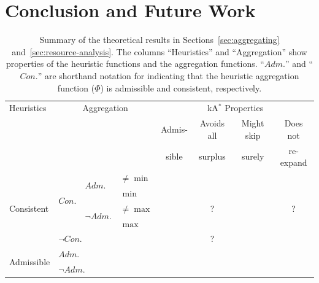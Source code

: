 \documentclass[smallextended]{svjour3}       %
\newcommand{\cmark}{\textcolor{green}{\ding{51}}}
\newcommand{\xmark}{\textcolor{red}{\ding{55}}}
\newcommand{\kastar}{kA$^*$\xspace}
\newcommand{\axiomadm}{admissible\xspace}
\newcommand{\axiomcons}{consistent\xspace}
\newcommand{\axiomreexp}{re-expansion-avoiding\xspace}
\newcommand{\shortadm}{\mathit{Adm.}}
\newcommand{\shortcon}{\mathit{Con.}}
\newcommand{\shortree}{\mathit{Ree.}}
\begin{document}

\section{Conclusion and Future Work}
\label{sec:conclusion}


\begin{table}
\centering
\begin{tabular}{ll@{\;}l@{\;}l*4{c}}
\toprule
Heuristics & \multicolumn{3}{c}{Aggregation} & \multicolumn{4}{c}{\kastar Properties}\\
\cmidrule{5-8}
&&&& \multirow{1}{*}{Admis-} & Avoids all & Might skip & Does not \\
&&&& sible & surplus & surely & re-expand\\
\midrule
\multirow{5}{*}{Consistent}
& \multirow{4}{*}{$\shortcon$} & \multirow{2}{*}{$\shortadm$} & $\neq \min$ & \cmark & \xmark & \xmark & \xmark \\
& & & $\min$ &  \cmark & \cmark & \xmark & \cmark\\
\cmidrule{3-4}
& & \multirow{2}{*}{$\neg \shortadm$} & $\neq \max$ & \cmark & ? & \cmark & ? \\
& & & $\max$ &  \cmark & \xmark & \cmark & \cmark\\
\cmidrule{2-4}
& \multicolumn{3}{l}{$\neg \shortcon$} & \xmark & ? & \cmark & \xmark\\
\midrule
\multirow{2}{*}{Admissible}
& \multicolumn{3}{l}{$\shortadm$} & \cmark & \xmark & \xmark & \xmark\\
& \multicolumn{3}{l}{$\neg \shortadm$} & \xmark & \xmark & \cmark & \xmark\\
\bottomrule
\end{tabular}
\caption{Summary of the theoretical results in Sections~\ref{sec:aggregating} and~\ref{sec:resource-analysis}. 
The columns ``Heuristics'' and ``Aggregation'' show properties of the heuristic functions and the aggregation functions. 
``$\shortadm$'' and ``$\shortcon$'' are shorthand notation for indicating that the heuristic aggregation function ($\Phi$) is \axiomadm and \axiomcons, respectively.
}
\end{table}
\end{document}
